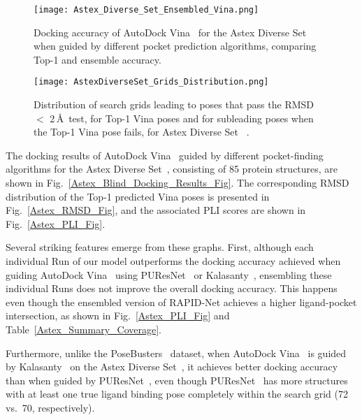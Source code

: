 \documentclass[10pt,conference]{IEEEtran}
\begin{document}
\begin{figure}[]{}
\texttt{[image: Astex\_Diverse\_Set\_Ensembled\_Vina.png]}
\caption{Docking accuracy of AutoDock Vina~\cite{eberhardt2021autodock} for the Astex Diverse Set~\cite{hartshorn2007diverse} when guided by different pocket prediction algorithms, comparing Top-1 and ensemble accuracy.}
\label{Astex_Reweighted_Results_Fig}
\end{figure}

\begin{figure}[]{}
\texttt{[image: AstexDiverseSet\_Grids\_Distribution.png]}
  \caption{Distribution of search grids leading to poses that pass the RMSD $<$ 2\,\AA\ test, for Top-1 Vina poses and for subleading poses when the Top-1 Vina pose fails, for Astex Diverse Set ~\cite{hartshorn2007diverse}.}
\label{Astex_Grids_Fig}
\end{figure}

The docking results of AutoDock Vina~\cite{eberhardt2021autodock} guided by different pocket-finding algorithms for the Astex Diverse Set~\cite{hartshorn2007diverse}, consisting of 85 protein structures, are shown in Fig.~\ref{Astex_Blind_Docking_Results_Fig}. The corresponding RMSD distribution of the Top-1 predicted Vina poses is presented in Fig.~\ref{Astex_RMSD_Fig}, and the associated PLI scores are shown in Fig.~\ref{Astex_PLI_Fig}.

Several striking features emerge from these graphs. First, although each individual Run of our model outperforms the docking accuracy achieved when guiding AutoDock Vina~\cite{eberhardt2021autodock} using PUResNet~\cite{kandel2021puresnet} or Kalasanty~\cite{stepniewska2020improving}, ensembling these individual Runs does not improve the overall docking accuracy. This happens even though the ensembled version of RAPID-Net achieves a higher ligand-pocket intersection, as shown in Fig.~\ref{Astex_PLI_Fig} and Table~\ref{Astex_Summary_Coverage}. 

Furthermore, unlike the PoseBusters~\cite{Buttenschoen2024} dataset, when AutoDock Vina~\cite{eberhardt2021autodock} is guided by Kalasanty~\cite{stepniewska2020improving} on the Astex Diverse Set~\cite{hartshorn2007diverse}, it achieves better docking accuracy than when guided by PUResNet~\cite{kandel2021puresnet}, even though PUResNet~\cite{kandel2021puresnet} has more structures with at least one true ligand binding pose completely within the search grid (72 vs.\ 70, respectively).
\end{document}
